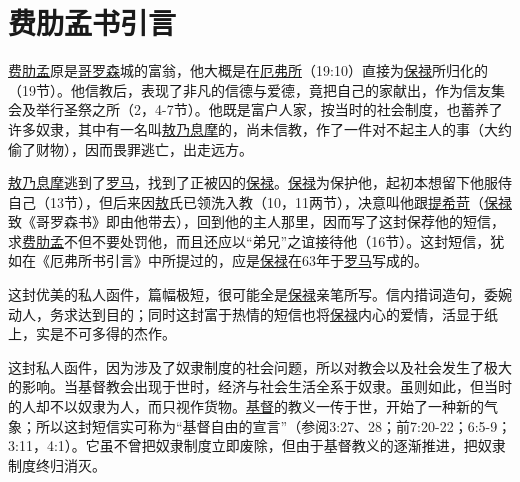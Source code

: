 \chapter*{费肋孟书引言}


\uline{费肋孟}原是\uline{哥罗森}城的富翁，他大概是在\uline{厄弗所}（19:10）直接为\uline{保禄}所归化的（19节）。他信教后，表现了非凡的信德与爱德，竟把自己的家献出，作为信友集会及举行圣祭之所（2，4-7节）。他既是富户人家，按当时的社会制度，也蓄养了许多奴隶，其中有一名叫\uline{敖乃息摩}的，尚未信教，作了一件对不起主人的事（大约偷了财物），因而畏罪逃亡，出走远方。

\uline{敖乃息摩}逃到了\uline{罗马}，找到了正被囚的\uline{保禄}。\uline{保禄}为保护他，起初本想留下他服侍自己（13节），但后来因\uline{敖}氏已领洗入教（10，11两节），决意叫他跟\uline{提希苛}（\uline{保禄}致《哥罗森书》即由他带去），回到他的主人那里，因而写了这封保荐他的短信，求\uline{费肋孟}不但不要处罚他，而且还应以“弟兄”之谊接待他（16节）。这封短信，犹如在《厄弗所书引言》中所提过的，应是\uline{保禄}在63年于\uline{罗马}写成的。

这封优美的私人函件，篇幅极短，很可能全是\uline{保禄}亲笔所写。信内措词造句，委婉动人，务求达到目的；同时这封富于热情的短信也将\uline{保禄}内心的爱情，活显于纸上，实是不可多得的杰作。

这封私人函件，因为涉及了奴隶制度的社会问题，所以对教会以及社会发生了极大的影响。当基督教会出现于世时，经济与社会生活全系于奴隶。虽则如此，但当时的人却不以奴隶为人，而只视作货物。\uline{基督}的教义一传于世，开始了一种新的气象；所以这封短信实可称为“基督自由的宣言”（参阅3:27、28；前7:20-22；6:5-9；3:11，4:1）。它虽不曾把奴隶制度立即废除，但由于基督教义的逐渐推进，把奴隶制度终归消灭。